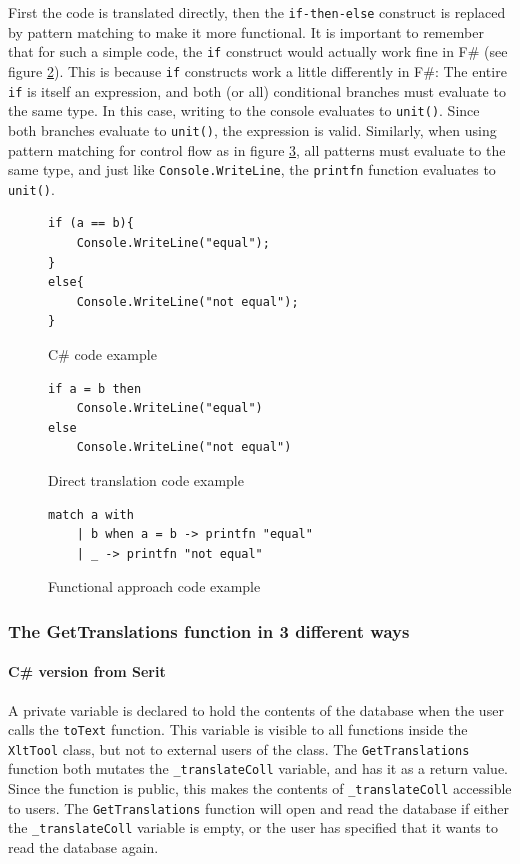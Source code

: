 \documentclass[12pt, a4paper]{article}
\newcommand{\code}[1]{{\small \texttt{#1}}}
\begin{document}
First the code is translated directly, then the \code{if-then-else} construct is replaced by pattern matching to make it more functional. It is important to remember that for such a simple code, the \code{if} construct would actually work fine in F\# (see figure \ref{fig:directTranslationIf}). This is because \code{if} constructs work a little differently in F\#: The entire \code{if} is itself an expression, and both (or all) conditional branches must evaluate to the same type. In this case, writing to the console evaluates to \code{unit()}. Since both branches evaluate to \code{unit()}, the expression is valid. Similarly, when using pattern matching for control flow as in figure \ref{fig:functionalApproachIf}, all patterns must evaluate to the same type, and just like \code{Console.WriteLine}, the \code{printfn} function evaluates to \code{unit()}.\\

\newpage

\begin{figure}[!h]
\begin{lstlisting}
if (a == b){
	Console.WriteLine("equal");
}
else{
	Console.WriteLine("not equal");
}
\end{lstlisting}
\caption{C\# code example}
\label{fig:CSharpIf}
\end{figure}

\begin{figure}[!h]
\begin{lstlisting}
if a = b then 
	Console.WriteLine("equal")
else 
	Console.WriteLine("not equal")
\end{lstlisting}
\caption{Direct translation code example}
\label{fig:directTranslationIf}
\end{figure}

\begin{figure}[!h]
\begin{lstlisting}
match a with
    | b when a = b -> printfn "equal"
    | _ -> printfn "not equal"
\end{lstlisting}
\caption{Functional approach code example}
\label{fig:functionalApproachIf}
\end{figure}

\newpage


\subsubsection{The GetTranslations function in 3 different ways}
\paragraph{C\# version from Serit} A private variable is declared to hold the contents of the database when the user calls the \code{toText} function. This variable is visible to all functions inside the \code{XltTool} class, but not to external users of the class. The \code{GetTranslations} function both mutates the \code{\_translateColl} variable, and has it as a return value. Since the function is public, this makes the contents of \code{\_translateColl} accessible to users. The \code{GetTranslations} function will open and read the database if either the \code{\_translateColl} variable is empty, or the user has specified that it wants to read the database again.
\end{document}
